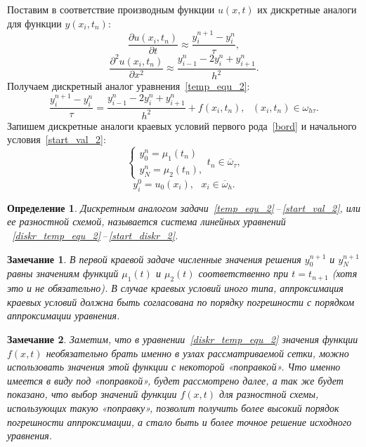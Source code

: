 \documentclass[11pt,a4paper,twoside,listtotoc,bibtotoc]{report}
\numberwithin{equation}{section}
\newtheorem*{definition}{Определение}
\theoremstyle{definition}
\theoremstyle{plain}
\newtheorem{note}{Замечание}[section]
\begin{document}
Поставим в соответствие производным функции $u(x,t)$ их дискретные аналоги
для функции $y(x_i, t_n)$:
%
$$
    \frac{\partial u(x_i,t_n)}{\partial t} \approx \frac{y_i^{n+1} - y_i^n}{\tau},
$$
%
$$
    \frac{\partial^2 u(x_i,t_n)}{\partial x^2} \approx
    \frac{y_{i-1}^{n} - 2y_i^n + y_{i+1}^n}{h^2}.
$$
%
Получаем дискретный аналог уравнения~\eqref{temp_equ_2}:
%
\begin{equation}
%
    \label{diskr_temp_equ_2}
    \frac{y_i^{n+1} - y_i^n}{\tau} = \frac{y_{i-1}^{n} - 2y_i^n + y_{i+1}^n}{h^2}
    + f(x_i,t_n),~~~(x_i, t_n)\in \omega_{h \tau}.
%
\end{equation}
%
Запишем дискретные аналоги краевых условий первого рода~\eqref{bord}
и начального условия~\eqref{start_val_2}:
%
\begin{equation}
%
    \label{bord_diskr_2}
    \begin{cases}
            y_0^{n} = \mu_1(t_{n}) \\
            y_N^{n} = \mu_2(t_{n}),
        \end{cases}
        t_{n}\in \overline{\omega}_{\tau},
%
\end{equation}
%
%
\begin{equation}
%
    \label{start_diskr_2}
    y_i^0 = u_0(x_i),~~~x_i\in \overline{\omega}_h.
%
\end{equation}
%
%
\begin{definition}
%
    Дискретным аналогом задачи~\eqref{temp_equ_2}\,--\,\eqref{start_val_2},
    или ее разностной схемой, называется система линейных уравнений
   ~\eqref{diskr_temp_equ_2}\,--\,\eqref{start_diskr_2}.
%
\end{definition}
%
%
\begin{note}
    В первой краевой задаче численные значения решения $y_0^{n+1}$ и $y_N^{n+1}$
    равны значениям функций $\mu_1(t)$ и $\mu_2(t)$ соответственно при $t=t_{n+1}$
    (хотя это и не обязательно). В случае краевых условий иного типа, аппроксимация
    краевых условий должна быть согласована по порядку погрешности с порядком аппроксимации
    уравнения.
\end{note}
%
\begin{note}
%
    Заметим, что в уравнении~\eqref{diskr_temp_equ_2} значения функции $f(x,t)$
    необязательно брать именно в узлах рассматриваемой сетки, можно использовать
    значения этой функции с некоторой «поправкой». Что именно имеется в виду
    под «поправкой», будет рассмотрено далее, а так же будет показано, что
    выбор значений функции $f(x,t)$ для разностной схемы, использующих такую «поправку»,
    позволит получить более высокий порядок погрешности аппроксимации, а стало быть и
    более точное решение исходного уравнения.
%
\end{note}
\end{document}
